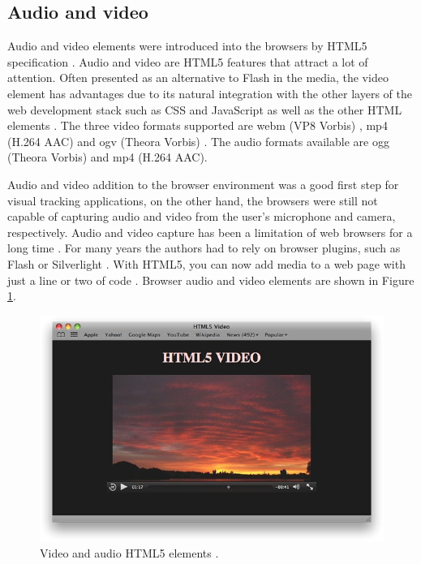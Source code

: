 
\subsection{Audio and video} %
\label{sub:basic_concepts:web:audio_and_video}

Audio and video elements were introduced into the browsers by HTML5 specification \cite{Hickson2013}. Audio and video are HTML5 features that attract a lot of attention. Often presented as an alternative to Flash \cite{Flash2013} in the media, the video element has advantages due to its natural integration with the other layers of the web development stack such as CSS \cite{CSS2013} and JavaScript as well as the other HTML elements \cite{WC2006}. The three video formats supported are webm (VP8 Vorbis) \cite{Vorbis2012}, mp4 (H.264 AAC) \cite{AAC2006} and ogv (Theora Vorbis) \cite{Theora2011}. The audio formats available are ogg (Theora Vorbis) and mp4 (H.264 AAC).

Audio and video addition to the browser environment was a good first step for visual tracking applications, on the other hand, the browsers were still not capable of capturing audio and video from the user's microphone and camera, respectively. Audio and video capture has been a limitation of web browsers for a long time \cite{Hickson2013}. For many years the authors had to rely on browser plugins, such as Flash \cite{Flash2013} or Silverlight \cite{Silverlight2013,Rocks2013}. With HTML5, you can now add media to a web page with just a line or two of code \cite{WebKit2013}. Browser audio and video elements \cite{Hickson2013} are shown in Figure \ref{figure:html5_audio_video}.

\begin{figure}[!htb]
  \centering
  \includegraphics[width=380pt]{chapters/basic_concepts/html5_audio_video.png}
  \caption{Video and audio HTML5 elements \cite{WebKit2013}.}
  \label{figure:html5_audio_video}
\end{figure}

